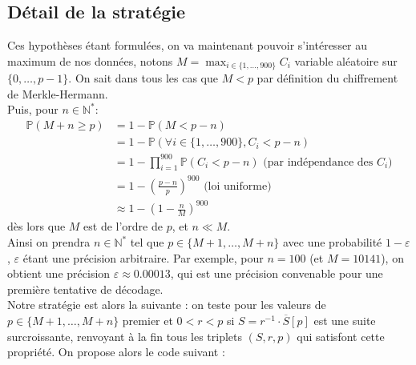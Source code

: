 \documentclass{article}
\begin{document}
\subsection{Détail de la stratégie}

Ces hypothèses étant formulées, on va maintenant pouvoir s'intéresser au maximum de nos données, notons $M = \displaystyle\max_{i\in \{1,\dots,900\}}C_i$ variable aléatoire sur $\{0,\dots,p-1\}$. On sait dans tous les cas que $M < p$ par définition du chiffrement de Merkle-Hermann.\\
Puis, pour $n\in \mathbb{N}^*$:
\begin{align*}
\mathbb{P}(M+n\geq p) &= 1 - \mathbb{P}(M < p-n)\\
&= 1-\mathbb{P}(\forall i \in \{1,\dots,900\}, C_i < p-n)\\
&=1-\prod_{i=1}^{900}\mathbb{P}(C_i < p-n) \text{ (par indépendance des }C_i\text{)}\\
&=1-\left(\frac{p-n}{p}\right)^{900}\text{ (loi uniforme)}\\
&\approx 1-\left(1-\frac{n}{M}\right)^{900}
\end{align*}
dès lors que $M$ est de l'ordre de $p$, et $n \ll M$.\\
Ainsi on prendra $n\in \mathbb{N}^*$ tel que $p\in \{M+1,\dots,M+n\}$ avec une probabilité $1-\varepsilon$, $\varepsilon$ étant une précision arbitraire. Par exemple, pour $n = 100$ (et $M = 10141$), on obtient une précision $\varepsilon\approx 0.00013$, qui est une précision convenable pour une première tentative de décodage.\\
Notre stratégie est alors la suivante : on teste pour les valeurs de $p\in \{M+1,\dots,M+n\}$ premier et $0 < r < p$ si $S = r^{-1}\cdot \overline{S} [p]$ est une suite surcroissante, renvoyant à la fin tous les triplets $(S,r,p)$ qui satisfont cette propriété. On propose alors le code suivant :\\
\end{document}
